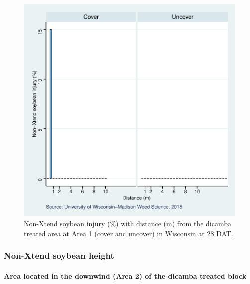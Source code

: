\documentclass[]{article}
\let\oldparagraph\paragraph
\renewcommand{\paragraph}[1]{\oldparagraph{#1}\mbox{}}
\begin{document}
\begin{figure}
\centering
\includegraphics{Report_files/figure-latex/unnamed-chunk-108-1.pdf}
\caption{Non-Xtend soybean injury (\%) with distance (m) from the
dicamba treated area at Area 1 (cover and uncover) in Wisconsin at 28
DAT.}
\end{figure}

\pagebreak
\newpage

\subsubsection{Non-Xtend soybean
height}\label{non-xtend-soybean-height-6}

\paragraph{Area located in the downwind (Area 2) of the dicamba treated
block}\label{area-located-in-the-downwind-area-2-of-the-dicamba-treated-block-1}
\end{document}
